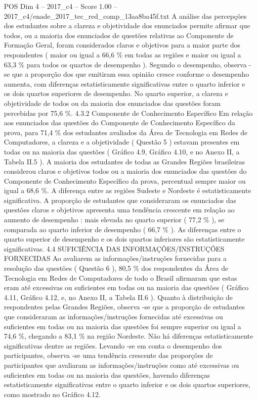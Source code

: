 \begin{textsample}{POS Dim 4 – 2017\_c4 – Score 1.00 – 2017\_c4/enade\_2017\_tec\_red\_comp\_13aa8ba45f.txt}
A análise das percepções dos estudantes sobre a clareza e objetividade dos enunciados permite afirmar que todos, ou a maioria dos enunciados de questões relativas ao Componente de Formação Geral, foram considerados claros e objetivos para a maior parte dos respondentes ( maior ou igual a 66,6 \% em todas as regiões e maior ou igual a 63,3 \% para todos os quartos de desempenho ).
Segundo o desempenho, observa -se que a proporção dos que emitiram essa opinião cresce conforme o desempenho aumenta, com diferenças estatisticamente significativas entre o quarto inferior e os dois quartos superiores de desempenho.
No quarto superior, a clareza e objetividade de todos ou da maioria dos enunciados das questões foram percebidas por 75,6 \%. 4.3.2 Componente de Conhecimento Específico Em relação aos enunciados das questões do Componente de Conhecimento Específico da prova, para 71,4 \% dos estudantes avaliados da Área de Tecnologia em Redes de Computadores, a clareza e a objetividade ( Questão 5 ) estavam presentes em todas ou na maioria das questões ( Gráfico 4.9, Gráfico 4.10, e no Anexo II, a Tabela II.5 ).
A maioria dos estudantes de todas as Grandes Regiões brasileiras considerou claros e objetivos todos ou a maioria dos enunciados das questões do Componente de Conhecimento Específico da prova, percentual sempre maior ou igual a 68,6 \%.
A diferença entre as regiões Sudeste e Nordeste é estatisticamente significativa.
A proporção de estudantes que consideraram os enunciados das questões claros e objetivos apresenta uma tendência crescente em relação ao aumento de desempenho : mais elevada no quarto superior ( 77,2 \% ), se comparada ao quarto inferior de desempenho ( 66,7 \% ).
As diferenças entre o quarto superior de desempenho e os dois quartos inferiores são estatisticamente significativas. 4.4 SUFICIÊNCIA DAS INFORMAÇÕES/INSTRUÇÕES FORNECIDAS Ao avaliarem as informações/instruções fornecidas para a resolução das questões ( Questão 6 ), 80,5 \% dos respondentes da Área de Tecnologia em Redes de Computadores de todo o Brasil afirmaram que estas eram até excessivas ou suficientes em todas ou na maioria das questões ( Gráfico 4.11, Gráfico 4.12, e, no Anexo II, a Tabela II.6 ).
Quanto à distribuição de respondentes pelas Grandes Regiões, observa -se que a proporção de estudantes que consideraram as informações/instruções fornecidas até excessivas ou suficientes em todas ou na maioria das questões foi sempre superior ou igual a 74,6 \%, chegando a 83,1 \% na região Nordeste.
Não há diferenças estatisticamente significativas dentre as regiões.
Levando -se em conta o desempenho dos participantes, observa -se uma tendência crescente das proporções de participantes que avaliaram as informações/instruções como até excessivas ou suficientes em todas ou na maioria das questões, havendo diferenças estatisticamente significativas entre o quarto inferior e os dois quartos superiores, como mostrado no Gráfico 4.12.

\end{textsample}
